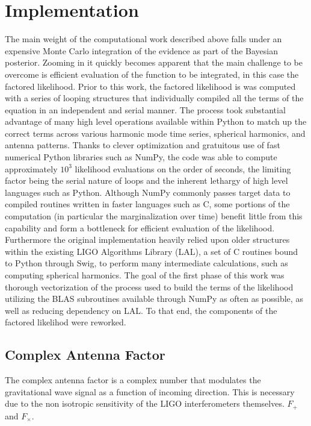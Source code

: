 \documentclass[paper=a4, fontsize=11pt]{scrartcl} %
\numberwithin{equation}{section} %
\numberwithin{figure}{section} %
\numberwithin{table}{section} %
\begin{document}
\section{Implementation}
The main weight of the computational work described above falls under an expensive Monte Carlo integration of the evidence as part of the Bayesian posterior. Zooming in it quickly becomes apparent that the main challenge to be overcome is efficient evaluation of the function to be integrated, in this case the factored likelihood. Prior to this work, the factored likelihood is was computed with a series of looping structures that individually compiled all the terms of the equation in an independent and serial manner. The process took substantial advantage of many high level operations available within Python to match up the correct terms across various harmonic mode time series, spherical harmonics, and antenna patterns. Thanks to clever optimization and gratuitous use of fast numerical Python libraries such as NumPy, the code was able to compute approximately $10^3$ likelihood evaluations on the order of seconds, the limiting factor being the serial nature of loops and the inherent lethargy of high level languages such as Python. Although NumPy commonly passes target data to compiled routines written in faster languages such as C, some portions of the computation (in particular the marginalization over time) benefit little from this capability and form a bottleneck for efficient evaluation of the likelihood. Furthermore the original implementation heavily relied upon older structures within the existing LIGO Algorithms Library (LAL), a set of C routines bound to Python through Swig, to perform many intermediate calculations, such as computing spherical harmonics. The goal of the first phase of this work was thorough vectorization of the process used to build the terms of the likelihood utilizing the BLAS subroutines available through NumPy as often as possible, as well as reducing dependency on LAL. To that end, the components of the factored likelihod were reworked. 

\subsection{Complex Antenna Factor}
The complex antenna factor is a complex number that modulates the gravitational wave signal as a function of incoming direction. This is necessary due to the non isotropic sensitivity of the LIGO interferometers themselves. $F_{+}$ and $F_{\times}$. 
\end{document}
